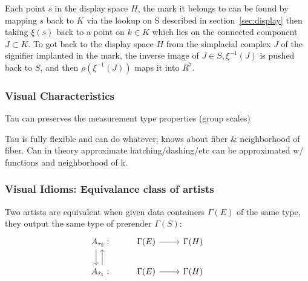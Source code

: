 \documentclass[../main.tex]{subfiles}
\begin{document}
Each point $s$ in the display space $H$, the mark it belongs to can be found by mapping $s$ back to $K$ via the lookup on S described in section~\ref{sec:display} then taking $\xi(s)$ back to a point on $k \in K$ which lies on the connected component $J \subset K$. To got back to the display space $H$  from the simplacial complex $J$ of the signifier implanted in the mark, the inverse image of $J \in S, \xi^{-1}(J)$ is pushed back to $S$, and then  $\rho(\xi^{-1}(J))$ maps it into $R^{7}$. 



\subsubsection{Visual Characteristics}
Tau can preserves the measurement type properties (group scales)


Tau is fully flexible and can do whatever; knows about fiber & neighborhood of fiber. Can in theory approximate hatching/dashing/etc can be approximated w/ functions and neighborhood of k. 
\subsubsection{Visual Idioms: Equivalance class of artists}
Two artists are equivalent when given data containers $\Gamma(E)$ of the same type, they output the same type of prerender $\Gamma(S)$:
\begin{equation}
    \begin{tikzcd}
        A_{\tau_2}: \arrow[d, shift right=2] & \Gamma(E) \arrow[r] & \Gamma(H) &                                                \\
        A_{\tau_1}: \arrow[u, shift right]   & \Gamma(E) \arrow[r] & \Gamma(H) 
    \end{tikzcd}
\end{equation}
\end{document}
